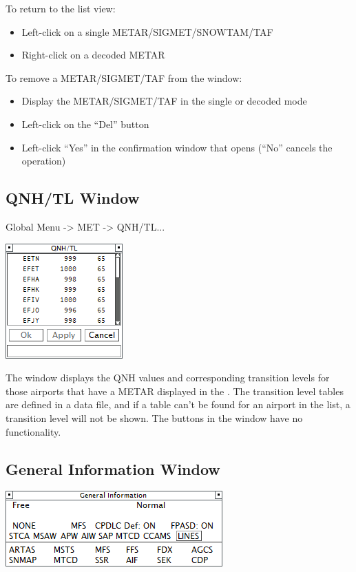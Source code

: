 \documentclass[11pt,a4paper,oldfontcommands]{memoir}
\begin{document}
To return to the list view:

\begin{itemize}
    \item Left-click on a single METAR/SIGMET/SNOWTAM/TAF
    \item Right-click on a decoded METAR
\end{itemize}

To remove a METAR/SIGMET/TAF from the window:

\begin{itemize}
    \item Display the METAR/SIGMET/TAF in the single or decoded mode
    \item Left-click on the “Del” button
    \item Left-click “Yes” in the confirmation window that opens (“No” cancels the operation)
\end{itemize}

\subsection{QNH/TL Window}
\label{win:qnhtl}

Global Menu -> MET -> QNH/TL...

\includegraphics{img/qnhtl.png}

The window displays the QNH values and corresponding transition levels for those airports that have a METAR displayed in the \textit{}. The transition level tables are defined in a data file, and if a table can’t be found for an airport in the list, a transition level will not be shown. The buttons in the window have no functionality.

\subsection{General Information Window}
\label{win:geninfo}

\includegraphics{img/geninfo.png}
\end{document}
